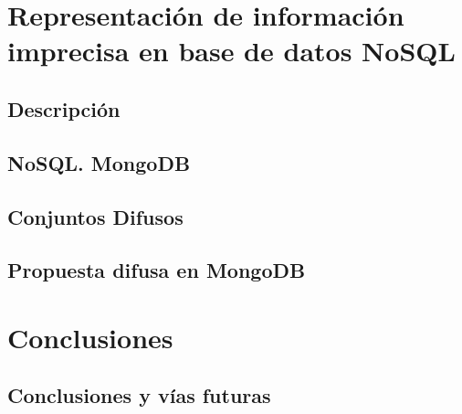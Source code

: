 \documentclass[ oneside,openany,titlepage,numbers=noenddot,headinclude,%
                footinclude=true,cleardoublepage=empty,abstractoff, %
                BCOR=5mm,paper=a4,fontsize=11pt,%
                spanish,american%
                ]{scrreprt}
\begin{document}
\part{Representación de información imprecisa en base de datos NoSQL}

\chapter{Descripción}




\chapter{NoSQL. MongoDB}


\chapter{Conjuntos Difusos}


\chapter{Propuesta difusa en MongoDB}


\part{Conclusiones}

\chapter{Conclusiones y vías futuras}


%
\cleardoublepage
\cleardoublepage
\cleardoublepage
\end{document}
